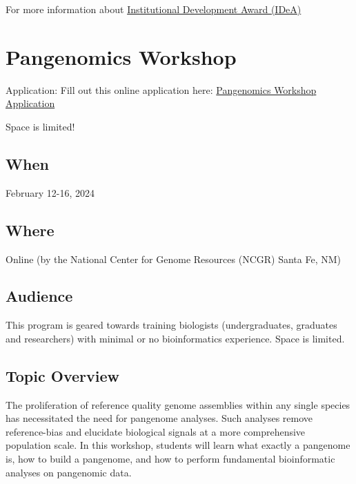 \documentclass[
]{book}
\begin{document}
For more information about \href{https://www.nigms.nih.gov/capacity-building/division-for-research-capacity-building/institutional-development-award-\%28idea\%29}{Institutional Development Award (IDeA)}

\hypertarget{pangenomics-workshop}{%
\chapter*{Pangenomics Workshop}\label{pangenomics-workshop}}

Application: Fill out this online application here: \href{https://docs.google.com/forms/d/e/1FAIpQLScJPueRpT0M4CHb2RjJI5DGHTXu6mutGBVBoOMCEQsO2JnQ1A/viewform}{Pangenomics Workshop Application}

Space is limited!

\hypertarget{when-1}{%
\section*{When}\label{when-1}}

February 12-16, 2024

\hypertarget{where}{%
\section*{Where}\label{where}}

Online (by the National Center for Genome Resources (NCGR) Santa Fe, NM)

\hypertarget{audience}{%
\section*{Audience}\label{audience}}

This program is geared towards training biologists (undergraduates, graduates and researchers) with minimal or no bioinformatics experience. Space is limited.

\hypertarget{topic-overview}{%
\section*{Topic Overview}\label{topic-overview}}

The proliferation of reference quality genome assemblies within any single species has necessitated the need for pangenome analyses. Such analyses remove reference-bias and elucidate biological signals at a more comprehensive population scale. In this workshop, students will learn what exactly a pangenome is, how to build a pangenome, and how to perform fundamental bioinformatic analyses on pangenomic data.
\end{document}
